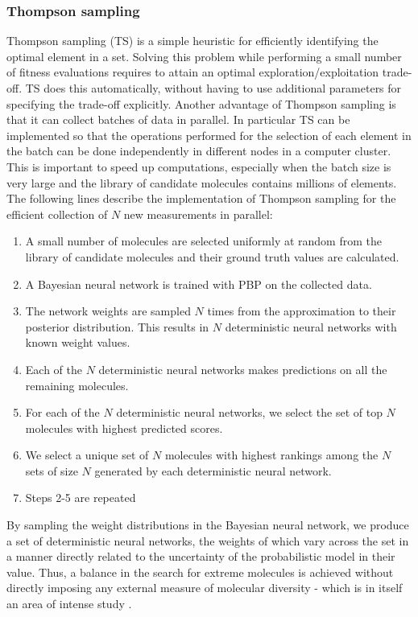 \subsubsection{Thompson sampling}

Thompson sampling (TS) \cite{Thompson_1933} is a simple heuristic for efficiently identifying the optimal element in a set. Solving this problem while performing a small number of fitness evaluations requires to attain an optimal exploration/exploitation trade-off. TS does this automatically, without having to use additional parameters for specifying the trade-off explicitly. Another advantage of Thompson sampling is that it can collect batches of data in parallel. In particular TS can be implemented so that the operations performed for the selection of each element in the batch can be done independently in different nodes in a computer cluster. This is important to speed up computations, especially when the batch size is very large and the library of candidate molecules contains millions of elements. The following lines describe the implementation of Thompson sampling for the efficient collection of $N$ new measurements in parallel:
\begin{enumerate}
\item A small number of molecules are selected uniformly at random from the library of candidate molecules and their ground truth values are calculated.
\item A Bayesian neural network is trained with PBP on the collected data.
\item The network weights are sampled $N$ times from the approximation to their posterior distribution. This results in $N$ deterministic neural networks with known weight values.
\item Each of the $N$ deterministic neural networks makes predictions on all the remaining molecules.
\item For each of the $N$ deterministic neural networks, we select the set of top $N$ molecules with highest predicted scores.
\item We select a unique set of $N$ molecules with highest rankings among the $N$ sets of size $N$ generated by each deterministic neural network.
\item Steps 2-5 are repeated
\end{enumerate}
By sampling the weight distributions in the Bayesian neural network, we produce a set of deterministic neural networks, the weights of which vary across the set in a manner directly related to the uncertainty of the probabilistic model in their value.  Thus, a balance in the search for extreme molecules is achieved without directly imposing any external measure of molecular diversity - which is in itself an area of intense study \cite{Maldonado_2006}.